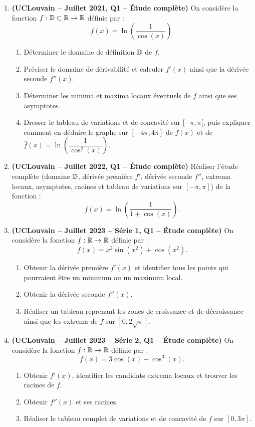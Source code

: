 \begin{enumerate}[label=\textbf{Exercice 4.\arabic* --}]
    \item \textbf{(UCLouvain -- Juillet 2021, Q1 -- Étude complète)} On considère la fonction $f : \mathbb{D} \subset \mathbb{R} \to \mathbb{R}$ définie par :
    \[
        f(x) = \ln\left(\frac{1}{\cos(x)}\right).
    \]
    \begin{enumerate}
        \item Déterminer le domaine de définition $\mathbb{D}$ de $f$.
        \item Préciser le domaine de dérivabilité et calculer $f'(x)$ ainsi que la dérivée seconde $f''(x)$.
        \item Déterminer les minima et maxima locaux éventuels de $f$ ainsi que ses asymptotes.
        \item Dresser le tableau de variations et de concavité sur $[-\pi, \pi[$, puis expliquer comment en déduire le graphe sur $[-4\pi, 4\pi]$ de $f(x)$ et de $\bar{f}(x) = \ln\left(\dfrac{1}{\cos^2(x)}\right)$.
    \end{enumerate}

    \item \textbf{(UCLouvain -- Juillet 2022, Q1 -- Étude complète)} Réaliser l'étude complète (domaine $\mathbb{D}$, dérivée première $f'$, dérivée seconde $f''$, extrema locaux, asymptotes, racines et tableau de variations sur $[-\pi, \pi]$) de la fonction :
    \[
        f(x) = \ln\left(\frac{1}{1 + \cos(x)}\right).
    \]

    \item \textbf{(UCLouvain -- Juillet 2023 -- Série 1, Q1 -- Étude complète)} On considère la fonction $f : \mathbb{R} \to \mathbb{R}$ définie par :
    \[
        f(x) = x^2\sin(x^2) + \cos(x^2).
    \]
    \begin{enumerate}
        \item Obtenir la dérivée première $f'(x)$ et identifier tous les points qui pourraient être un minimum ou un maximum local.
        \item Obtenir la dérivée seconde $f''(x)$.
        \item Réaliser un tableau reprenant les zones de croissance et de décroissance ainsi que les extrema de $f$ sur $[0, 2\sqrt{\pi}]$.
    \end{enumerate}

    \item \textbf{(UCLouvain -- Juillet 2023 -- Série 2, Q1 -- Étude complète)} On considère la fonction $f : \mathbb{R} \to \mathbb{R}$ définie par :
    \[
        f(x) = 3\cos(x) - \cos^3(x).
    \]
    \begin{enumerate}
        \item Obtenir $f'(x)$, identifier les candidats extrema locaux et trouver les racines de $f$.
        \item Obtenir $f''(x)$ et ses racines.
        \item Réaliser le tableau complet de variations et de concavité de $f$ sur $[0, 3\pi]$.
    \end{enumerate}


\end{enumerate}
